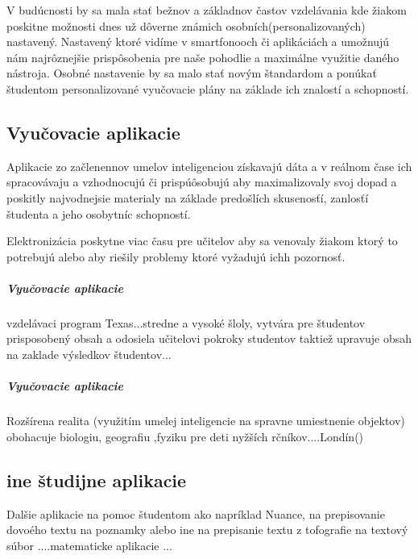 \documentclass[10pt,oneside,slovak,a4paper]{article}
\begin{document}
V budúcnosti by sa mala stať bežnov a základnov častov vzdelávania kde žiakom poskitne možnosti dnes už dôverne známich osobních(personalizovaných) nastavený. Nastavený ktoré vidíme v smartfonooch či aplikáciách a umožnujú nám najrôznejšie prispôsobenia pre naše pohodlie a maximálne využitie daného nástroja. Osobné nastavenie by sa malo stať novým štandardom a ponúkať študentom personalizované vyučovacie plány na základe ich znalostí a schopností.

\subsection{Vyučovacie aplikacie}

Aplikacie zo začlenennov umelov inteligenciou získavajú dáta a v reálnom čase ich spracovávaju a vzhodnocujú či prispúôsobujú aby maximalizovaly svoj dopad a poskitly najvodnejsie materialy na základe predošlích skusenosťí, zanlosťí študenta a jeho osobytníc schopností.

Elektronizácia poskytne viac času pre učitelov aby sa venovaly žiakom ktorý to potrebujú alebo aby riešily problemy ktoré vyžadujú ichh pozornosť.  

\subparagraph{Vyučovacie aplikacie}
vzdelávaci program Texas...stredne a vysoké šloly, vytvára pre študentov prisposobený obsah a odosiela učitelovi pokroky studentov taktiež upravuje obsah na zaklade výsledkov študentov...



\subparagraph{Vyučovacie aplikacie}

Rozšírena realita  (využitím umelej inteligencie na spravne umiestnenie objektov) obohacuje biologiu, geografiu ,fyziku pre deti nyžších rčníkov....Londín()

\subsection{ine študijne aplikacie}

Dalšie aplikacie na pomoc študentom ako napríklad Nuance, na prepisovanie dovoého textu na poznamky alebo ine na prepisanie textu z tofografie na textový súbor ....matematicke aplikacie ...



\end{document}
